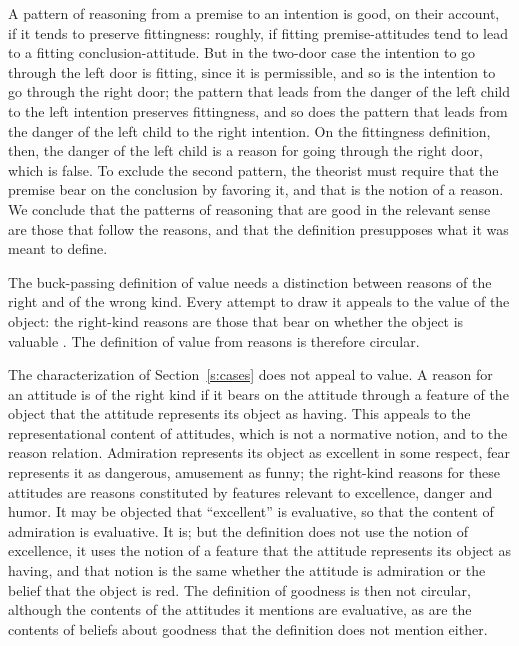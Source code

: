 \documentclass{situationist-preprint}
\begin{document}
\begin{reply}
A pattern of reasoning from a premise to an intention is good, on their account, if it tends to preserve fittingness: roughly, if fitting premise-attitudes tend to lead to a fitting conclusion-attitude. But in the two-door case the intention to go through the left door is fitting, since it is permissible, and so is the intention to go through the right door; the pattern that leads from the danger of the left child to the left intention preserves fittingness, and so does the pattern that leads from the danger of the left child to the right intention. On the fittingness definition, then, the danger of the left child is a reason for going through the right door, which is false. To exclude the second pattern, the theorist must require that the premise bear on the conclusion by favoring it, and that is the notion of a reason. We conclude that the patterns of reasoning that are good in the relevant sense are those that follow the reasons, and that the definition presupposes what it was meant to define.
\end{reply}

\begin{objection}\label{o:wkr}
The buck-passing definition of value needs a distinction between reasons of the right and of the wrong kind. Every attempt to draw it appeals to the value of the object: the right-kind reasons are those that bear on whether the object is valuable \citep{Vayrynen2006}. The definition of value from reasons is therefore circular.
\end{objection}

\begin{reply}
The characterization of Section~\ref{s:cases} does not appeal to value. A reason for an attitude is of the right kind if it bears on the attitude through a feature of the object that the attitude represents its object as having. This appeals to the representational content of attitudes, which is not a normative notion, and to the reason relation. Admiration represents its object as excellent in some respect, fear represents it as dangerous, amusement as funny; the right-kind reasons for these attitudes are reasons constituted by features relevant to excellence, danger and humor. It may be objected that \enquote{excellent} is evaluative, so that the content of admiration is evaluative. It is; but the definition does not use the notion of excellence, it uses the notion of a feature that the attitude represents its object as having, and that notion is the same whether the attitude is admiration or the belief that the object is red. The definition of goodness is then not circular, although the contents of the attitudes it mentions are evaluative, as are the contents of beliefs about goodness that the definition does not mention either.
\end{reply}
\end{document}
